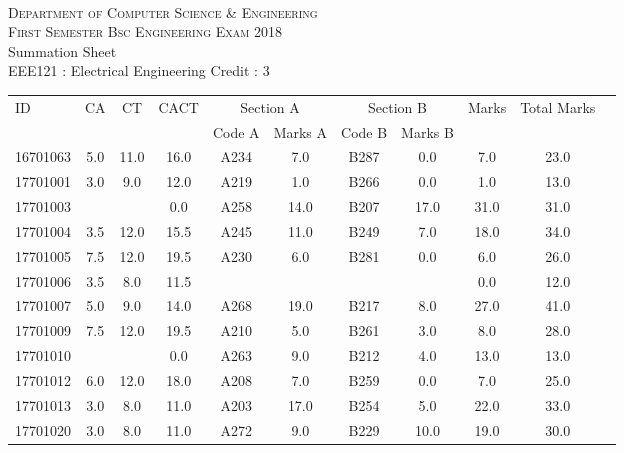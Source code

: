 \documentclass[12pt]{article}
\begin{document}
    \centering
    \begin{minipage}[m]{.8\textwidth} \centering 
	\smallskip
	\\
	\textsc{Department of Computer Science \& Engineering}\\
	\textsc{ First Semester Bsc Engineering Exam 2018}\\
    {\large {\sc Summation Sheet}}\\  
     {\centering EEE121 : Electrical Engineering     Credit : 3 } \\
    \end{minipage} 
    \begin{center} 
	\renewcommand{\arraystretch}{1.08}
	\begin{small}
    \begin{tabular}{|l|c|c|c|c|c|c|c|c|c|c|} \hline
	\multirow{2}{*}{ID} & 	\multirow{2}{*}{CA}  & 	\multirow{2}{*}{CT}  & 	\multirow{2}{*}{CACT}  & \multicolumn{2 }{c|}{Section A}& \multicolumn{2 }{c|}{Section B} & 	\multirow{2}{*}{Marks}  & 	\multirow{2}{*}{Total Marks}  \\ 
	&  &  &  & Code A & Marks A & Code B & Marks B&  &  \\ \hline
16701063 & 5.0 & 11.0 & 16.0 & A234 & 7.0 & B287 & 0.0 & 7.0 & 23.0\\ \hline 
17701001 & 3.0 & 9.0 & 12.0 & A219 & 1.0 & B266 & 0.0 & 1.0 & 13.0\\ \hline 
17701003 &  &  & 0.0 & A258 & 14.0 & B207 & 17.0 & 31.0 & 31.0\\ \hline 
17701004 & 3.5 & 12.0 & 15.5 & A245 & 11.0 & B249 & 7.0 & 18.0 & 34.0\\ \hline 
17701005 & 7.5 & 12.0 & 19.5 & A230 & 6.0 & B281 & 0.0 & 6.0 & 26.0\\ \hline 
17701006 & 3.5 & 8.0 & 11.5 &  &  &  &  & 0.0 & 12.0\\ \hline 
17701007 & 5.0 & 9.0 & 14.0 & A268 & 19.0 & B217 & 8.0 & 27.0 & 41.0\\ \hline 
17701009 & 7.5 & 12.0 & 19.5 & A210 & 5.0 & B261 & 3.0 & 8.0 & 28.0\\ \hline 
17701010 &  &  & 0.0 & A263 & 9.0 & B212 & 4.0 & 13.0 & 13.0\\ \hline 
17701012 & 6.0 & 12.0 & 18.0 & A208 & 7.0 & B259 & 0.0 & 7.0 & 25.0\\ \hline 
17701013 & 3.0 & 8.0 & 11.0 & A203 & 17.0 & B254 & 5.0 & 22.0 & 33.0\\ \hline 
17701020 & 3.0 & 8.0 & 11.0 & A272 & 9.0 & B229 & 10.0 & 19.0 & 30.0\\ \hline 

\end{tabular}
\end{small}
\end{center}
\end{document}
